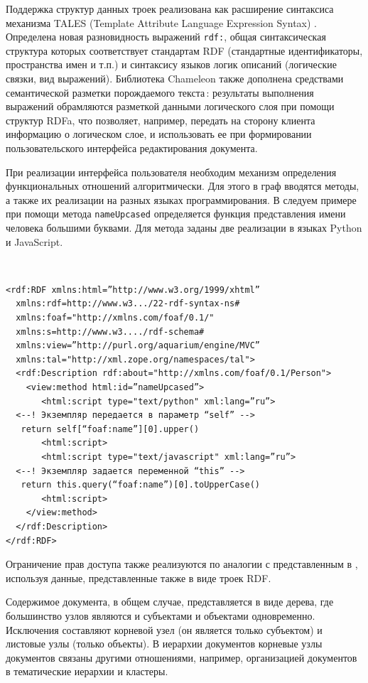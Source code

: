 \documentclass[utf8]{../IncArticle}
\begin{document}
Поддержка структур данных троек реализована как расширение синтаксиса
механизма TALES (Template Attribute Language Expression Syntax)
\cite{zopetal}.  Определена новая разновидность выражений
\texttt{rdf:}, общая синтаксическая структура которых соответствует
стандартам RDF (стандартные идентификаторы, пространства имен и т.п.)
и синтаксису языков логик описаний (логические связки, вид выражений).
Библиотека Chameleon также дополнена средствами семантической разметки
порождаемого текста\,: результаты выполнения выражений обрамляются
разметкой данными логического слоя при помощи структур RDFa, что
позволяет, например, передать на сторону клиента информацию о
логическом слое, и использовать ее при формировании пользовательского
интерфейса редактирования документа.

При реализации интерфейса пользователя необходим механизм определения
функциональных отношений алгоритмически.  Для этого в граф вводятся
методы, а также их реализации на разных языках программирования.  В следуем примере при
помощи метода \texttt{nameUpcased} определяется функция представления
имени человека большими буквами.  Для метода заданы две реализации в
языках Python и JavaScript.

\begingroup
\tt
\begin{verbatim}
<rdf:RDF xmlns:html=”http://www.w3.org/1999/xhtml”
  xmlns:rdf=http://www.w3.../22-rdf-syntax-ns#
  xmlns:foaf="http://xmlns.com/foaf/0.1/"
  xmlns:s=http://www.w3..../rdf-schema#
  xmlns:view=”http://purl.org/aquarium/engine/MVC”
  xmlns:tal="http://xml.zope.org/namespaces/tal">
  <rdf:Description rdf:about="http://xmlns.com/foaf/0.1/Person">
    <view:method html:id=”nameUpcased”>
       <html:script type="text/python" xml:lang=”ru”>
  <--! Экземпляр передается в параметр “self” -->
   return self[“foaf:name”][0].upper()
       <html:script>
       <html:script type="text/javascript" xml:lang=”ru”>
  <--! Экземпляр задается переменной “this” -->
   return this.query(“foaf:name”)[0].toUpperCase()
       <html:script>
    </view:method>
  </rdf:Description>
</rdf:RDF>
\end{verbatim}
\endgroup

Ограничение прав доступа также реализуются по аналогии с
представленным в \cite{b2:6,b2:7}, используя данные, представленные
также в виде троек RDF.

Содержимое документа, в общем случае, представляется в виде дерева,
где большинство узлов являются и субъектами и объектами
одновременно. Исключения составляют корневой узел (он является только
субъектом) и листовые узлы (только объекты).  В иерархии документов
корневые узлы документов связаны другими отношениями, например,
организацией документов в тематические иерархии и кластеры.
\end{document}
